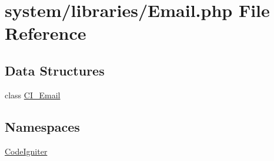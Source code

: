 \hypertarget{_email_8php}{\section{system/libraries/\-Email.php File Reference}
\label{_email_8php}
}
\subsection*{Data Structures}
\begin{DoxyCompactItemize}
\item 
class \hyperlink{class_c_i___email}{C\-I\-\_\-\-Email}
\end{DoxyCompactItemize}
\subsection*{Namespaces}
\begin{DoxyCompactItemize}
\item 
\hyperlink{namespace_code_igniter}{Code\-Igniter}
\end{DoxyCompactItemize}
